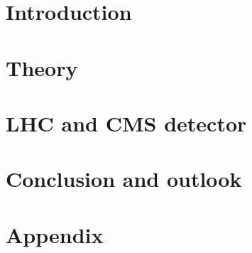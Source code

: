\documentclass[
twoside=false,
headsepline,     %
headings=normal,
open=any,
numbers=noenddot, %
numbering %
]{scrreprt} %
\begin{document}
\setcounter{page}{1}
\tableofcontents

\cleardoublepage

\setcounter{page}{1}





\listoffigures
\chapter{Introduction}
\label{sec:introduction}

\cleardoublepage

\chapter{Theory}
\label{sec:theory}
% 
\cleardoublepage

\chapter{LHC and CMS detector}
\label{sec:detector}
% 
\cleardoublepage



\chapter{Conclusion and outlook}
\label{sec:conclusion}
% 
\cleardoublepage

\chapter{Appendix}
\label{sec:appendix}
% 
























\cleardoublepage
{}
{}


\end{document}
